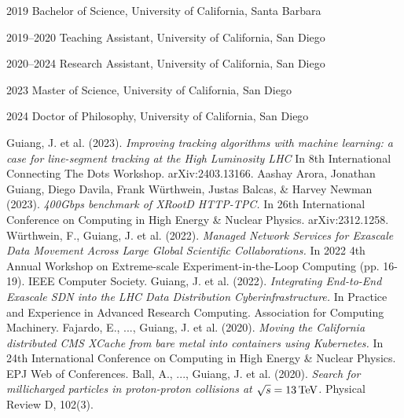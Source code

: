 \begin{vita}
\noindent
\begin{cv}{}
\begin{cvlist}{}
\item[2019] Bachelor of Science, University of California, Santa Barbara
\item[2019--2020] Teaching Assistant, University of California, San Diego
\item[2020--2024] Research Assistant, University of California, San Diego
\item[2023] Master of Science, University of California, San Diego
\item[2024] Doctor of Philosophy, University of California, San Diego
\end{cvlist}
\end{cv}

\publications
\noindent Guiang, J. et al. (2023). 
\textit{Improving tracking algorithms with machine learning: a case for line-segment tracking at the High Luminosity LHC}
In 8th International Connecting The Dots Workshop. arXiv:2403.13166.
\newline
\newline
\noindent Aashay Arora, Jonathan Guiang, Diego Davila, Frank Würthwein, Justas Balcas, \& Harvey Newman (2023). 
\textit{400Gbps benchmark of XRootD HTTP-TPC.}
In 26th International Conference on Computing in High Energy \& Nuclear Physics. arXiv:2312.1258.
\newline
\newline
\noindent W\"urthwein, F., Guiang, J. et al. (2022). 
\textit{Managed Network Services for Exascale Data Movement Across Large Global Scientific Collaborations.}
In 2022 4th Annual Workshop on Extreme-scale Experiment-in-the-Loop Computing (pp. 16-19). IEEE Computer Society.
\newline
\newline
\noindent Guiang, J. et al. (2022). 
\textit{Integrating End-to-End Exascale SDN into the LHC Data Distribution Cyberinfrastructure.}
In Practice and Experience in Advanced Research Computing. Association for Computing Machinery.
\newline
\newline
\noindent Fajardo, E., ..., Guiang, J. et al. (2020). 
\textit{Moving the California distributed CMS XCache from bare metal into containers using Kubernetes.}
In 24th International Conference on Computing in High Energy \& Nuclear Physics. EPJ Web of Conferences.
\newline
\newline
\noindent Ball, A., ..., Guiang, J. et al. (2020). 
\textit{Search for millicharged particles in proton-proton collisions at $\sqrt{s} = 13\,\text{Te\hspace{-.08em}V}$.}
Physical Review D, 102(3).
\end{vita}
